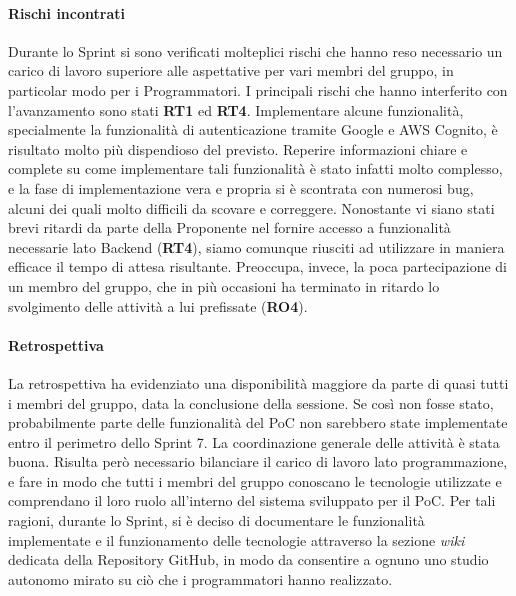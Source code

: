\documentclass[a4paper,12pt]{article}
\begin{document}
\paragraph{Rischi incontrati}
Durante lo Sprint si sono verificati molteplici rischi che hanno reso necessario un carico di lavoro superiore alle aspettative per vari membri del gruppo, in particolar modo per i Programmatori. I principali rischi che hanno interferito con l'avanzamento sono stati \textbf{RT1} ed \textbf{RT4}. Implementare alcune funzionalità, specialmente la funzionalità di autenticazione tramite Google e AWS Cognito, è risultato molto più dispendioso del previsto. Reperire informazioni chiare e complete su come implementare tali funzionalità è stato infatti molto complesso, e la fase di implementazione vera e propria si è scontrata con numerosi bug, alcuni dei quali molto difficili da scovare e correggere. 
Nonostante vi siano stati brevi ritardi da parte della Proponente nel fornire accesso a funzionalità necessarie lato Backend (\textbf{RT4}), siamo comunque riusciti ad utilizzare in maniera efficace il tempo di attesa risultante. Preoccupa, invece, la poca partecipazione di un membro del gruppo, che in più occasioni ha terminato in ritardo lo svolgimento delle attività a lui prefissate (\textbf{RO4}).
\paragraph{Retrospettiva}
La retrospettiva ha evidenziato una disponibilità maggiore da parte di quasi tutti i membri del gruppo, data la conclusione della sessione. Se così non fosse stato, probabilmente parte delle funzionalità del PoC non sarebbero state implementate entro il perimetro dello Sprint 7. La coordinazione generale delle attività è stata buona. Risulta però necessario bilanciare il carico di lavoro lato programmazione, e fare in modo che tutti i membri del gruppo conoscano le tecnologie utilizzate e comprendano il loro ruolo all'interno del sistema sviluppato per il PoC. Per tali ragioni, durante lo Sprint, si è deciso di documentare le funzionalità implementate e il funzionamento delle tecnologie attraverso la sezione \textit{wiki} dedicata della Repository GitHub, in modo da consentire a ognuno uno studio autonomo mirato su ciò che i programmatori hanno realizzato.
\end{document}
